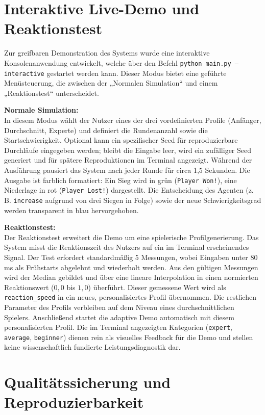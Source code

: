 \documentclass[11pt,a4paper]{article}
\begin{document}
\section{Interaktive Live-Demo und Reaktionstest}

Zur greifbaren Demonstration des Systems wurde eine interaktive Konsolenanwendung entwickelt, welche über den Befehl \texttt{python main.py --interactive} gestartet werden kann. Dieser Modus bietet eine geführte Menüsteuerung, die zwischen der „Normalen Simulation“ und einem „Reaktionstest“ unterscheidet.

\textbf{Normale Simulation:}\\
In diesem Modus wählt der Nutzer eines der drei vordefinierten Profile (Anfänger, Durchschnitt, Experte) und definiert die Rundenanzahl sowie die Startschwierigkeit. Optional kann ein spezifischer Seed für reproduzierbare Durchläufe eingegeben werden; bleibt die Eingabe leer, wird ein zufälliger Seed generiert und für spätere Reproduktionen im Terminal angezeigt.
Während der Ausführung pausiert das System nach jeder Runde für circa 1,5 Sekunden. Die Ausgabe ist farblich formatiert: Ein Sieg wird in grün (\texttt{Player Won!}), eine Niederlage in rot (\texttt{Player Lost!}) dargestellt. Die Entscheidung des Agenten (z.\,B. \texttt{increase} aufgrund von drei Siegen in Folge) sowie der neue Schwierigkeitsgrad werden transparent in blau hervorgehoben.

\textbf{Reaktionstest:}\\
Der Reaktionstest erweitert die Demo um eine spielerische Profilgenerierung. Das System misst die Reaktionszeit des Nutzers auf ein im Terminal erscheinendes Signal. Der Test erfordert standardmäßig 5 Messungen, wobei Eingaben unter 80 ms als Frühstarts abgelehnt und wiederholt werden.
Aus den gültigen Messungen wird der Median gebildet und über eine lineare Interpolation in einen normierten Reaktionswert ($0,0$ bis $1,0$) überführt. Dieser gemessene Wert wird als \texttt{reaction\_speed} in ein neues, personalisiertes Profil übernommen. Die restlichen Parameter des Profils verbleiben auf dem Niveau eines durchschnittlichen Spielers. Anschließend startet die adaptive Demo automatisch mit diesem personalisierten Profil. Die im Terminal angezeigten Kategorien (\texttt{expert}, \texttt{average}, \texttt{beginner}) dienen rein als visuelles Feedback für die Demo und stellen keine wissenschaftlich fundierte Leistungsdiagnostik dar.

\section{Qualitätssicherung und Reproduzierbarkeit}
\end{document}
